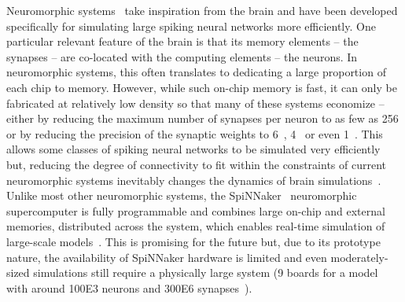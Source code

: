 \documentclass[9pt,a4paper]{amsart}
\begin{document}
Neuromorphic systems~\citep{Frenkel2018,Furber2014,Merolla2014,Qiao2015,Schemmel2017} take inspiration from the brain and have been developed specifically for simulating large spiking neural networks more efficiently.
One particular relevant feature of the brain is that its memory elements -- the synapses -- are co-located with the computing elements -- the neurons.
In neuromorphic systems, this often translates to dedicating a large proportion of each chip to memory.
However, while such on-chip memory is fast, it can only be fabricated at relatively low density so that many of these systems economize -- either by reducing the maximum number of synapses per neuron to as few as \num{256} or by reducing the precision of the synaptic weights to \SI{6}{\bit}~\citep{Schemmel2017}, \SI{4}{\bit}~\citep{Frenkel2018} or even \SI{1}{\bit}~\citep{Merolla2014}.
This allows some classes of spiking neural networks to be simulated very efficiently but, reducing the degree of connectivity to fit within the constraints of current neuromorphic systems inevitably changes the dynamics of brain simulations~\citep{VanAlbada2015}.
Unlike most other neuromorphic systems, the SpiNNaker~\citep{Furber2014} neuromorphic supercomputer is fully programmable and combines large on-chip and external memories, distributed across the system, which enables real-time simulation of large-scale models~\citep{Rhodes2019}.
This is promising for the future but, due to its prototype nature, the availability of SpiNNaker hardware is limited and even moderately-sized simulations still require a physically large system (9 boards for a model with around \num{100E3} neurons and \num{300E6} synapses~\citep{Rhodes2019}).
\end{document}
